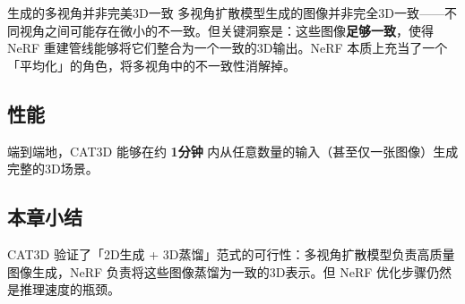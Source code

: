 \begin{warningbox}{生成的多视角并非完美3D一致}
多视角扩散模型生成的图像并非完全3D一致——不同视角之间可能存在微小的不一致。但关键洞察是：这些图像\textbf{足够一致}，使得 NeRF 重建管线能够将它们整合为一个一致的3D输出。NeRF 本质上充当了一个「平均化」的角色，将多视角中的不一致性消解掉。
\end{warningbox}

\subsection{性能}

端到端地，CAT3D 能够在约 \textbf{1分钟} 内从任意数量的输入（甚至仅一张图像）生成完整的3D场景。

\subsection{本章小结}

CAT3D 验证了「2D生成 + 3D蒸馏」范式的可行性：多视角扩散模型负责高质量图像生成，NeRF 负责将这些图像蒸馏为一致的3D表示。但 NeRF 优化步骤仍然是推理速度的瓶颈。

